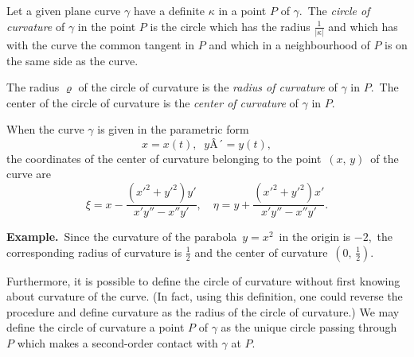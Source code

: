 \documentclass[12pt]{article}
\theoremstyle{definition}
\begin{document}
Let a given plane curve $\gamma$ have a definite 
 $\kappa$ in 
a point $P$ of $\gamma$.\, The {\em circle of curvature} of $\gamma$ in the 
point $P$ is the circle which has the radius $\frac{1}{|\kappa|}$ 
and which has with the curve the common tangent in $P$ and which 
in a neighbourhood of $P$ is on the same side as the curve.

The radius $\varrho$ of the circle of curvature is the 
{\em radius of curvature} of $\gamma$ in $P$.\, The center of the 
circle of curvature is the {\em center of curvature} of $\gamma$ in $P$.

When the curve $\gamma$ is given in the parametric form
              $$x = x(t),\;\; y Â´= y(t),$$
the coordinates of the center of curvature belonging to the point\, $(x,\,y)$\, 
of the curve are
$$\xi = x-\frac{(x'^2+y'^2)y'}{x'y''-x''y'},\quad
\eta = y+\frac{(x'^2+y'^2)x'}{x'y''-x''y'}.$$


\textbf{Example.}\, Since the curvature of the parabola \,$y = x^2$\, 
in the origin is\; $-2$,\, the corresponding radius of curvature is 
$\frac{1}{2}$ and the center of curvature\, $(0,\,\frac{1}{2})$.

Furthermore, it is possible to define the circle of curvature without
first knowing about curvature of the curve.  (In fact, using this definition,
one could reverse the procedure and define curvature as the radius of
the circle of curvature.)   We may define the circle of curvature 
a point $P$ of $\gamma$ as the unique circle passing through $P$ which 
makes a second-order contact with $\gamma$ at $P$.  
\end{document}
